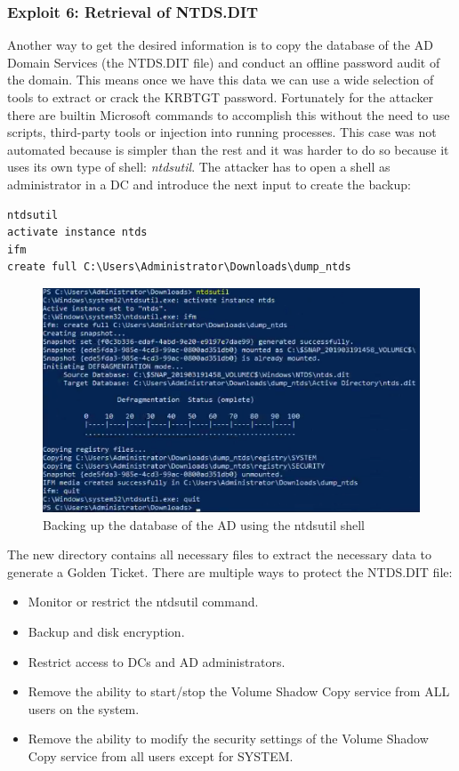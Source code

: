 \subsubsection{Exploit 6: Retrieval of NTDS.DIT}
Another way to get the desired information is to copy the database of the AD Domain Services (the NTDS.DIT file) and conduct an offline password audit of the domain. This means once we have this data we can use a wide selection of tools to extract or crack the KRBTGT password.
Fortunately for the attacker there are builtin Microsoft commands to accomplish this without the need to use scripts, third-party tools or injection into running processes\cite{ntdsdit_tools}\cite{ntdsutil_cyberis}\cite{dump_ways}\cite{extracting_ntds}\cite{ntds_powershell}.
\linej
\linej
This case was not automated because is simpler than the rest and it was harder to do so because it uses its own type of shell: \textit{ntdsutil}.
The attacker has to open a shell as administrator in a DC and introduce the next input to create the backup:
\begin{lstlisting}[style=PS,frame=none]
ntdsutil
activate instance ntds
ifm
create full C:\Users\Administrator\Downloads\dump_ntds
\end{lstlisting}
\begin{figure}[H]
	\centering
	\includegraphics[width=\textwidth]{figuras/ntdsutil.png}
	\caption{Backing up the database of the AD using the ntdsutil shell}
\end{figure}
The new directory contains all necessary files to extract the necessary data to generate a Golden Ticket.
\linej
\linej
There are multiple ways to protect the NTDS.DIT file\cite{protect_NTDS}\cite{hood}:
\begin{itemize}
	\item Monitor or restrict the ntdsutil command.
	\item Backup and disk encryption.
	\item Restrict access to DCs and AD administrators.
	\item Remove the ability to start/stop the Volume Shadow Copy service from ALL users on the system.
	\item Remove the ability to modify the security settings of the Volume Shadow Copy service from all users except for SYSTEM.
\end{itemize}
